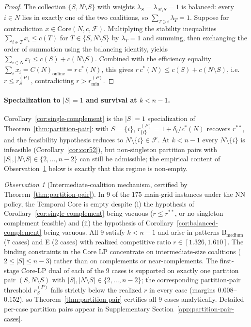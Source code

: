 \documentclass[11pt]{article}
\theoremstyle{plain}
\theoremstyle{definition}
\theoremstyle{remark}
\newtheorem{observation}[theorem]{Observation}
\newcommand{\F}{\mathcal{F}}
\newcommand{\cstar}{c^{\ast}}
\begin{document}
\begin{proof}
The collection $\{S,N\setminus S\}$ with weights $\lambda_S=\lambda_{N\setminus S}=1$ is balanced: every $i\in N$ lies in exactly one of the two coalitions, so $\sum_{T\ni i}\lambda_T=1$. Suppose for contradiction $x\in\mathrm{Core}(N,c,\F)$. Multiplying the stability inequalities $\sum_{i\in T} x_i\le c(T)$ for $T\in\{S,N\setminus S\}$ by $\lambda_T=1$ and summing, then exchanging the order of summation using the balancing identity, yields $\sum_{i\in N} x_i \le c(S)+c(N\setminus S)$. Combined with the efficiency equality $\sum_i x_i = C(N)_{\text{online}} = r\,\cstar(N)$, this gives $r\,\cstar(N)\le c(S)+c(N\setminus S)$, i.e.\ $r\le r^{(P)}_{S}$, contradicting $r>r^{(P)}_{\min}$.
\end{proof}

\paragraph{Specialization to $|S|=1$ and survival at $k<n-1$.} Corollary~\ref{cor:single-complement} is the $|S|=1$ specialization of Theorem~\ref{thm:partition-pair}: with $S=\{i\}$, $r^{(P)}_{\{i\}}=1+\delta_i/\cstar(N)$ recovers $r^{\ast\ast}$, and the feasibility hypothesis reduces to $N\setminus\{i\}\in\F$. At $k<n-1$ every $N\setminus\{i\}$ is infeasible (Corollary~\ref{cor:cor52}), but non-singleton partition pairs with $|S|,|N\setminus S|\in\{2,\ldots,n-2\}$ can still be admissible; the empirical content of Observation~\ref{obs:intermediate} below is exactly that this regime is non-empty.

\begin{observation}[Intermediate-coalition mechanism, certified by Theorem~\ref{thm:partition-pair}]
\label{obs:intermediate}
In 9 of the 175 main-grid instances under the NN policy, the Temporal Core is empty despite (i) the hypothesis of Corollary~\ref{cor:single-complement} being vacuous ($r\le r^{\ast\ast}$, or no singleton complement feasible) and (ii) the hypothesis of Corollary~\ref{cor:balanced-complement} being vacuous. All 9 satisfy $k<n-1$ and arise in patterns $\text{B}_{\text{medium}}$ (7 cases) and E (2 cases) with realized competitive ratio $r\in[1.326,1.610]$. The binding constraints in the Core LP concentrate on intermediate-size coalitions ($2\le |S|\le n-3$) rather than on complements or near-complements. The first-stage Core-LP dual of each of the 9 cases is supported on exactly one partition pair $(S,N\setminus S)$ with $|S|,|N\setminus S|\in\{2,\ldots,n-2\}$; the corresponding partition-pair threshold $r^{(P)}_{S}$ falls strictly below the realized $r$ in every case (margins $0.008$--$0.152$), so Theorem~\ref{thm:partition-pair} certifies all 9 cases analytically. Detailed per-case partition pairs appear in Supplementary Section~\ref{app:partition-pair-cases}.
\end{observation}
\end{document}
